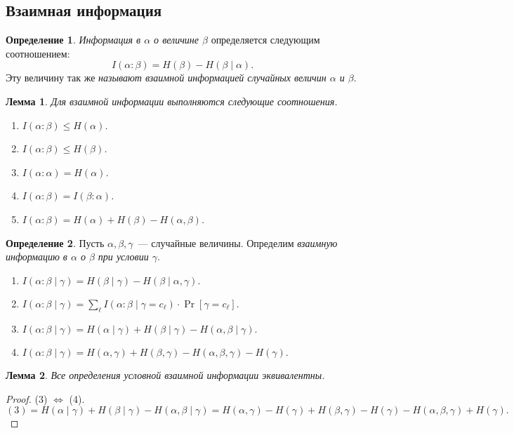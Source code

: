 \documentclass[12pt]{article}
\theoremstyle{definition}
\newtheorem{definition}{Определение}[section]
\theoremstyle{plain}
\newtheorem{lemma}{Лемма}[section]
\theoremstyle{remark}
\begin{document}
\subsection{Взаимная информация}
\begin{definition}
\emph{Информация в \(\alpha\) о величине \(\beta\)} определяется следующим соотношением:
\[
    I(\alpha:\beta) = H(\beta) - H(\beta\mid\alpha).
\]
Эту величину так же \emph{называют взаимной информацией случайных величин \(\alpha\) и \(\beta\)}.
\end{definition}
\begin{lemma}
Для взаимной информации выполняются следующие соотношения.
\begin{enumerate}
\item \(I(\alpha:\beta) \le H(\alpha) \).
\item \(I(\alpha:\beta) \le H(\beta) \).
\item \(I(\alpha:\alpha) = H(\alpha) \).
\item \(I(\alpha:\beta) = I(\beta:\alpha) \).
\item \(I(\alpha:\beta) = H(\alpha) + H(\beta) - H(\alpha,\beta) \).
\end{enumerate}
\end{lemma}
\begin{definition}
    Пусть \(\alpha,\beta,\gamma\)~--- случайные величины. Определим
    \emph{взаимную информацию в \(\alpha\) о \(\beta\) при условии \(\gamma\)}.
    \begin{enumerate}
        \item \(I(\alpha:\beta\mid\gamma) = H(\beta\mid\gamma) -
            H(\beta\mid\alpha,\gamma).\)
        \item \(I(\alpha:\beta\mid\gamma) = \sum_\ell I(\alpha:\beta \mid
            \gamma=c_\ell)\cdot \Pr[\gamma = c_\ell].\)
        \item \(I(\alpha:\beta\mid\gamma) = H(\alpha\mid\gamma) + H(\beta\mid\gamma) -
            H(\alpha,\beta\mid\gamma).\)
        \item \(I(\alpha:\beta\mid\gamma) = H(\alpha,\gamma) + H(\beta,\gamma) -
            H(\alpha,\beta,\gamma) - H(\gamma)\).
    \end{enumerate}
\end{definition}
\begin{lemma} 
    Все определения условной взаимной информации эквивалентны.
\end{lemma}
\begin{proof}
    (3) \(\iff\) (4).
    \[
    (3) = H(\alpha\mid\gamma) + H(\beta\mid\gamma) - H(\alpha,\beta\mid\gamma) =
    H(\alpha,\gamma) - H(\gamma) + H(\beta,\gamma) - H(\gamma) -
    H(\alpha,\beta,\gamma) + H(\gamma).
    \]

\end{proof}
\end{document}
